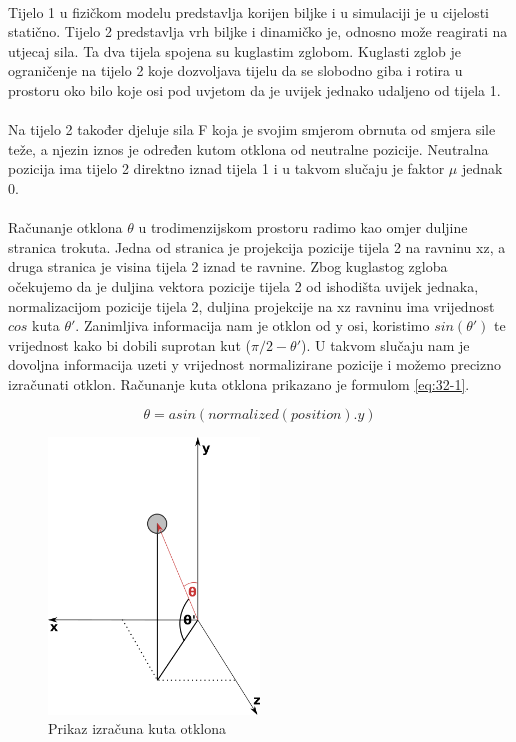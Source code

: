 \documentclass[times, utf8, diplomski]{fer}
\begin{document}
\paragraph{}
Tijelo 1 u fizičkom modelu predstavlja korijen biljke i u simulaciji je u cijelosti 
statično. Tijelo 2 predstavlja vrh biljke i dinamičko je, odnosno može reagirati na utjecaj
sila. Ta dva tijela spojena su kuglastim zglobom. Kuglasti zglob je ograničenje na tijelo 2 
koje dozvoljava tijelu da se slobodno giba i rotira u prostoru oko bilo koje osi pod uvjetom 
da je uvijek jednako udaljeno od tijela 1.

\paragraph{}
Na tijelo 2 također djeluje sila F koja je svojim smjerom obrnuta od smjera sile teže, a 
njezin iznos je određen kutom otklona od neutralne pozicije. Neutralna pozicija ima tijelo 2 
direktno iznad tijela 1 i u takvom slučaju je faktor $\mu$ jednak 0.

\paragraph{}
Računanje otklona $\theta$ u trodimenzijskom prostoru radimo kao omjer duljine 
stranica trokuta. Jedna od stranica je projekcija pozicije tijela 2 na ravninu 
xz, a druga stranica je visina tijela 2 iznad te ravnine. Zbog kuglastog zgloba 
očekujemo da je duljina vektora pozicije tijela 2 od ishodišta uvijek jednaka, 
normalizacijom pozicije tijela 2, duljina projekcije na xz ravninu ima 
vrijednost $cos$ kuta $\theta'$. Zanimljiva informacija nam je otklon od y osi, koristimo 
$sin(\theta')$ te vrijednost kako bi dobili suprotan kut ($\pi / 2 - \theta'$). U takvom 
slučaju nam je dovoljna informacija uzeti y vrijednost normalizirane pozicije i možemo 
precizno izračunati otklon. Računanje kuta otklona prikazano je formulom \ref{eq:32-1}.

\begin{equation}
\theta = asin(normalized(position).y)
\label{eq:32-1}
\end{equation}

\begin{figure}[h]
	\centering
	\includegraphics[width=0.5\textwidth]{img/32-2}
	\caption{Prikaz izračuna kuta otklona}
	\label{fig:32-2}
\end{figure}
\end{document}
